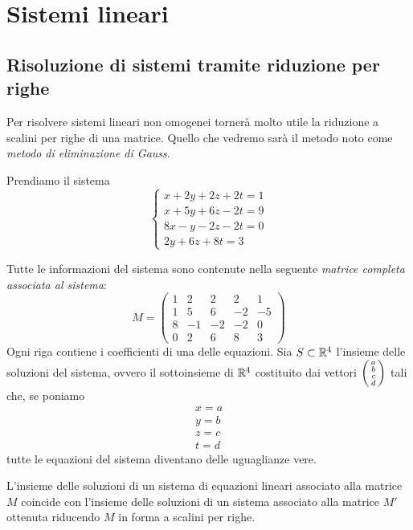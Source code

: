 \chapter{Sistemi lineari}
\section{Risoluzione di sistemi tramite riduzione per righe}
Per risolvere sistemi lineari non omogenei tornerà molto utile la riduzione
a scalini per righe di una matrice. Quello che vedremo sarà il metodo noto come
\emph{metodo di	eliminazione di Gauss}.

\begin{example}
	Prendiamo il sistema
	\[
		\begin{cases}
			x + 2y + 2z + 2t = 1 \\
			x +5y + 6z -2t = 9   \\
			8x - y -2z -2t = 0   \\
			2y + 6z + 8t = 3
		\end{cases}
	\]

	Tutte le informazioni del sistema sono contenute nella seguente
	\emph{matrice completa associata al sistema}:
	\[
		M = \begin{pmatrix}
			1 & 2  & 2  & 2  & 1  \\
			1 & 5  & 6  & -2 & -5 \\
			8 & -1 & -2 & -2 & 0  \\
			0 & 2  & 6  & 8  & 3
		\end{pmatrix}
	\]
	Ogni riga contiene i coefficienti di una delle equazioni.
	Sia $S \subset \mathbb{R}^4$ l'insieme delle soluzioni del sistema, ovvero
	il sottoinsieme di $\mathbb{R}^4$ costituito dai vettori
	$\begin{psmallmatrix} a \\ b \\ c \\ d \end{psmallmatrix}$ tali che, se poniamo
	\begin{gather*}
		x = a \\
		y = b \\
		z = c \\
		t = d
	\end{gather*}
	tutte le equazioni del sistema diventano delle uguaglianze vere.
\end{example}


\begin{theorem}
	L'insieme delle soluzioni di un sistema di equazioni lineari associato alla
	matrice $M$ coincide con l'insieme delle soluzioni di un sistema associato
	alla matrice $M'$ ottenuta riducendo $M$ in forma a scalini per righe.
\end{theorem}

